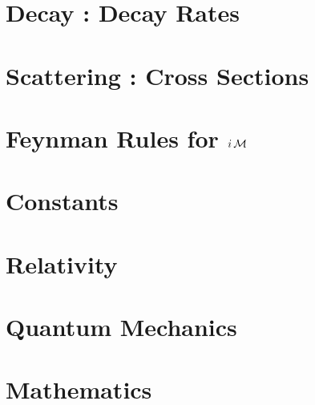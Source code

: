 \documentclass[landscape,8pt,a4paper,english]{extarticle}
\begin{document}
\begin{multicols*}{3}
        \section*{Decay : Decay Rates}
        \section*{Scattering : Cross Sections}
        \section*{Feynman Rules for $i\operatorname{\mathcal{M}}$}
        \section*{Constants}
        \section*{Relativity}
        \section*{Quantum Mechanics}
        \section*{Mathematics}
\end{multicols*}
\end{document}
